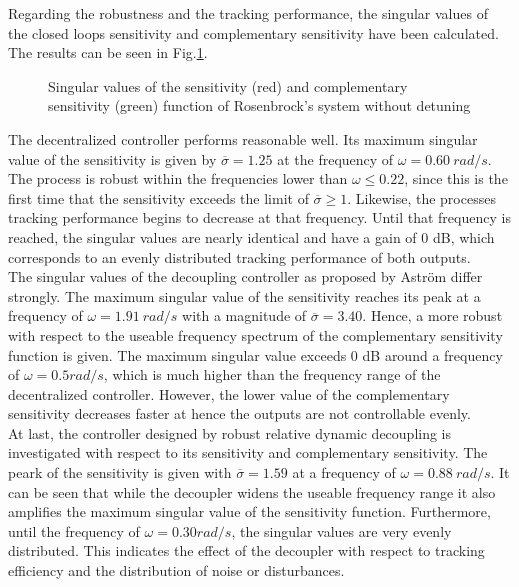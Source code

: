Regarding the robustness and the tracking performance, the singular values of the closed loops sensitivity and complementary sensitivity have been calculated. The results can be seen in Fig.\ref{c:fotd:s:rosenbrock:f:SingVal}.\\

\begin{figure}[H]\centering

\caption{Singular values of the sensitivity (red) and complementary sensitivity (green) function of Rosenbrock's system without detuning}
\label{c:fotd:s:rosenbrock:f:SingVal}
\end{figure}


The decentralized controller performs reasonable well. Its maximum singular value of the sensitivity is given by $\overline{\sigma} = 1.25$ at the frequency of $\omega = 0.60 ~rad/s$. The process is robust within the frequencies lower than $\omega \leq 0.22$, since this is the first time that the sensitivity exceeds the limit of $\overline{\sigma} \geq 1$. Likewise, the processes tracking performance begins to decrease at that frequency. Until that frequency is reached, the singular values are nearly identical and have a gain of 0 dB, which corresponds to an evenly distributed tracking performance of both outputs. \\

The singular values of the decoupling controller as proposed by Astr\"om differ strongly. The maximum singular value of the sensitivity reaches its peak at a frequency of $\omega = 1.91 ~rad/s$ with a magnitude of $\overline{\sigma} = 3.40$. Hence, a more robust with respect to the useable frequency spectrum of the complementary sensitivity function is given. The maximum singular value exceeds 0 dB around a frequency of $\omega = 0.5 rad/s$, which is much higher than the frequency range of the decentralized controller. However, the lower value of the complementary sensitivity decreases faster at hence the outputs are not controllable evenly.\\

At last, the controller designed by robust relative dynamic decoupling is investigated with respect to its sensitivity and complementary sensitivity. The peark of the sensitivity is given with $\overline{\sigma} = 1.59$ at a frequency of $\omega = 0.88 ~rad/s$. It can be seen that while the decoupler widens the useable frequency range it also amplifies the maximum singular value of the sensitivity function. Furthermore, until the frequency of $\omega = 0.30 rad/s$, the singular values are very evenly distributed. This indicates the effect of the decoupler with respect to tracking efficiency and the distribution of noise or disturbances.\\

